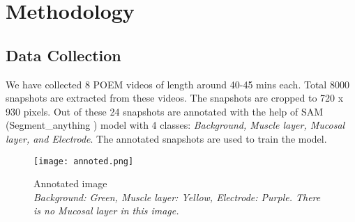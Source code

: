 \section{Methodology}
\label{sec:Methodology}

\subsection{Data Collection}
We have collected 8 POEM videos of length around 40-45 mins each. Total 8000 snapshots are extracted from these videos. The snapshots are cropped to 720 x 930 pixels. Out of these 24 snapshots are annotated with the help of SAM (Segment\_anything \cite{sam-model})  model with 4 classes: \textit{Background, Muscle layer, Mucosal layer, and Electrode}. The annotated snapshots are used to train the model.

\begin{figure}[h]
    \centering
    \texttt{[image: annoted.png]}
    \caption{Annotated image \\ \textit{Background: Green, Muscle layer: Yellow, Electrode: Purple. There is no Mucosal layer in this image.}}
    \label{fig:annotated}
\end{figure}